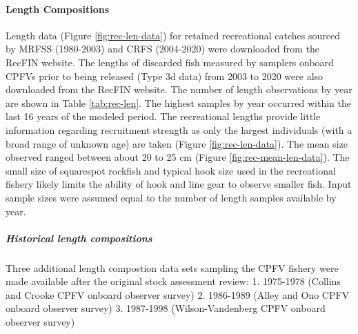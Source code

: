 \documentclass[11pt,
  english,
  a4paper,
]{article}
\begin{document}
\leavevmode\tagmcend\tagstructend\par


\hypertarget{length-compositions}{%
\paragraph{Length Compositions}\label{length-compositions}}

\leavevmode\tagmcend\tagstructend


Length data (Figure \ref{fig:rec-len-data}) for retained recreational catches sourced by MRFSS (1980-2003) and CRFS (2004-2020) were downloaded from the RecFIN website. The lengths of discarded fish measured by samplers onboard CPFVs prior to being released (Type 3d data) from 2003 to 2020 were also downloaded from the RecFIN website. The number of length observations by year are shown in Table \ref{tab:rec-len}. The highest samples by year occurred within the last 16 years of the modeled period. The recreational lengths provide little information regarding recruitment strength as only the largest individuals (with a broad range of unknown age) are taken (Figure \ref{fig:rec-len-data}). The mean size observed ranged between about 20 to 25 cm (Figure \ref{fig:rec-mean-len-data}). The small size of squarespot rockfish and typical hook size used in the recreational fishery likely limits the ability of hook and line gear to observe smaller fish. Input sample sizes were assumed equal to the number of length samples available by year.

\leavevmode\tagmcend\tagstructend\par


\hypertarget{historical-length-compositions}{%
\subparagraph{Historical length compositions}\label{historical-length-compositions}}

\leavevmode\tagmcend\tagstructend


Three additional length compostion data sets sampling the CPFV fishery were made available after the original stock assessment review: 1. 1975-1978 (Collins and Crooke CPFV onboard observer survey) 2. 1986-1989 (Alley and Ono CPFV onboard observer survey) 3. 1987-1998 (Wilson-Vandenberg CPFV onboard observer survey)
\end{document}
